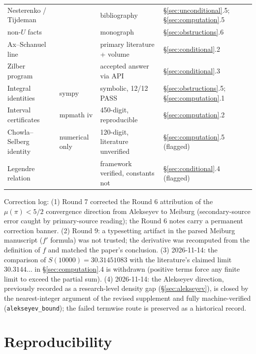 \documentclass[11pt]{amsart}
\theoremstyle{definition}
\theoremstyle{remark}
\numberwithin{equation}{section}
\newcommand{\irr}{\mu}
\begin{document}
\begin{center}
\begin{tabularx}{\textwidth}{@{}p{}p{}p{}X@{}}
Nesterenko / Tijdeman & \cite{Nesterenko1996,Tijdemann1971} & bibliography & \S\ref{sec:unconditional}.5; \S\ref{sec:computation}.5 \\
non-$U$ facts & \cite{Baker} & monograph & \S\ref{sec:obstructions}.6 \\
Ax--Schanuel line & \cite{Ax1971,MPT2019,BakkerTsimerman2019,CambridgeFF} & primary literature + volume & \S\ref{sec:conditional}.2 \\
Zilber program & \cite{MO33817} & accepted answer via API & \S\ref{sec:conditional}.3 \\
Integral identities & sympy & symbolic, 12/12 PASS & \S\ref{sec:obstructions}.5; \S\ref{sec:computation}.1 \\
Interval certificates & mpmath iv & 450-digit, reproducible & \S\ref{sec:computation}.2 \\
Chowla--Selberg identity & numerical only & 120-digit, literature unverified & \S\ref{sec:computation}.5 (flagged) \\
Legendre relation & \cite{DLMF23} & framework verified, constants not & \S\ref{sec:conditional}.4 (flagged) \\
\bottomrule
\end{tabularx}
\end{center}

Correction log: (1) Round 7 corrected the Round 6 attribution of the $\irr(\pi)<5/2$ convergence direction from Alekseyev to Meiburg (secondary-source error caught by primary-source reading); the Round 6 notes carry a permanent correction banner. (2) Round 9: a typesetting artifact in the parsed Meiburg manuscript ($f'$ formula) was not trusted; the derivative was recomputed from the definition of $f$ and matched the paper's conclusion. (3) 2026-11-14: the comparison of $S(10000)=30.31451083$ with the literature's claimed limit $30.3144\dots$ in \S\ref{sec:computation}.4 is withdrawn (positive terms force any finite limit to exceed the partial sum). (4) 2026-11-14: the Alekseyev direction, previously recorded as a research-level density gap (\S\ref{sec:alekseyev}), is closed by the nearest-integer argument of the revised supplement and fully machine-verified (\texttt{alekseyev\_\allowbreak{}bound}); the failed termwise route is preserved as a historical record.

\section{Reproducibility}\label{app:repro}
\end{document}
